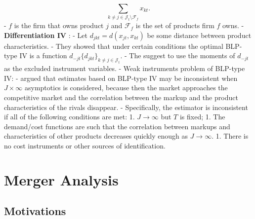 \documentclass[
]{book}
\begin{document}
\begin{equation}
\sum_{k \neq j \in \mathcal{J}_t \setminus \mathcal{F}_{f}} x_{kt}.
\end{equation}
- \(f\) is the firm that owns product \(j\) and \(\mathcal{F}_{f}\) is the set of products firm \(f\) owns.
- \textbf{Differentiation IV} \citep{Gandhi2015a}:
- Let \(d_{jkt} = d(x_{jt}, x_{kt})\) be some distance between product characteristics.
- They showed that under certain conditions the optimal BLP-type IV is a function \(d_{-jt}\{d_{jkt}\}_{k \neq j \in \mathcal{J}_t}\).
- The suggest to use the moments of \(d_{-jt}\) as the excluded instrument variables.
- Weak instruments problem of BLP-type IV:
- \citet{Armstrong2016b} argued that estimates based on BLP-type IV may be inconsistent when \(J \times \infty\) asymptotics is considered, because then the market approaches the competitive market and the correlation between the markup and the product characteristics of the rivals disappear.
- Specifically, the estimator is inconsistent if all of the following conditions are met:
1. \(J \to \infty\) but \(T\) is fixed;
1. The demand/cost functions are such that the correlation between markups and characteristics of other products decreases quickly enough as \(J \to \infty\).
1. There is no cost instruments or other sources of identification.

\hypertarget{merger}{%
\chapter{Merger Analysis}\label{merger}}

\hypertarget{motivations}{%
\section{Motivations}\label{motivations}}
\end{document}
